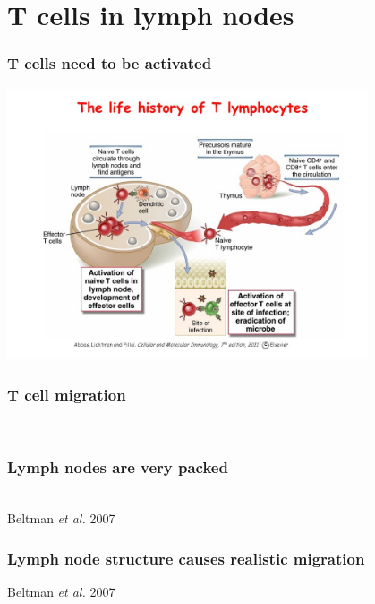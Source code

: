 \documentclass[compress]{beamer}
\begin{document}
\section{T cells in lymph nodes}
\begin{frame} 
\frametitle{T cells need to be activated}   
\begin{center}
 \includegraphics[width=0.8\textwidth]{figures/tcellcycle.jpg}\\
\end{center}
\end{frame}

\begin{frame} 
\frametitle{T cell migration}   
\begin{center}
  \\
\end{center}
\end{frame}

\begin{frame} 
\frametitle{Lymph nodes are very packed}   
\begin{center}
 \\
\tiny Beltman \textit{et al.} 2007
\end{center}
\end{frame}

\begin{frame}
\frametitle{Lymph node structure causes realistic migration}   
\begin{center}
\tiny Beltman \textit{et al.} 2007
\end{center}
\end{frame}
\end{document}
